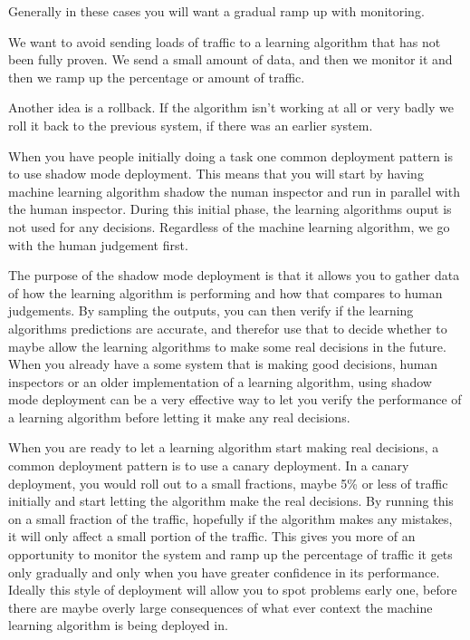 Generally in these cases you will want a gradual ramp up with monitoring.

We want to avoid sending loads of traffic to a learning algorithm that has not been fully proven.
We send a small amount of data, and then we monitor it and then we ramp up the percentage or amount of traffic.

Another idea is a rollback.
If the algorithm isn't working at all or very badly we roll it back to the previous system, if there was an earlier system.

When you have people initially doing a task one common deployment pattern is to use shadow mode deployment.
This means that you will start by having machine learning algorithm shadow the numan inspector and run in parallel with the human inspector.
During this initial phase, the learning algorithms ouput is not used for any decisions.
Regardless of the machine learning algorithm, we go with the human judgement first.

The purpose of the shadow mode deployment is that it allows you to gather data of how the learning algorithm is performing and how that compares to human judgements.
By sampling the outputs, you can then verify if the learning algorithms predictions are accurate, and therefor use that to decide whether to maybe allow the learning algorithms to make some real decisions in the future.
When you already have a some system that is making good decisions, human inspectors or an older implementation of a learning algorithm, using shadow mode deployment can be a very effective way to let you verify the performance of a learning algorithm before letting it make any real decisions.

When you are ready to let a learning algorithm start making real decisions, a common deployment pattern is to use a canary deployment.
In a canary deployment, you would roll out to a small fractions, maybe 5\% or less of traffic initially and start letting the algorithm make the real decisions.
By running this on a small fraction of the traffic, hopefully if the algorithm makes any mistakes, it will only affect a small portion of the traffic.
This gives you more of an opportunity to monitor the system and ramp up the percentage of traffic it gets only gradually and only when you have greater confidence in its performance.
Ideally this style of deployment will allow you to spot problems early one, before there are maybe overly large consequences of what ever context the machine learning algorithm is being deployed in.


